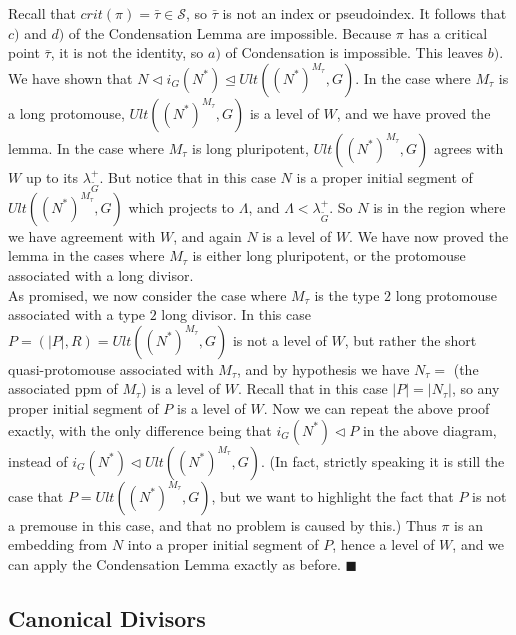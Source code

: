 \documentclass[12pt]{article}
\begin{document}
Recall that $crit (\pi) = \bar{\tau} \in \mathcal{S}$, so $\bar{\tau}$ is not an index or pseudoindex.  It follows that $c)$ and $d)$ of the Condensation Lemma are impossible.  Because $\pi$ has a critical point $\bar{\tau}$, it is not the identity, so $a)$ of Condensation is impossible.  This leaves $b)$.  We have shown that $N \lhd  i_G (N^*) \unlhd Ult ((N^*)^{M_\tau} , G )$.  In the case where $M_\tau$ is a long protomouse, $Ult ((N^*)^{M_\tau} , G )$ is a level of $W$, and we have proved the lemma.  In the case where $M_\tau$ is long pluripotent, $Ult ((N^*)^{M_\tau} , G )$ agrees with $W$ up to its $\lambda_{\tilde{G}}^+$.  But notice that in this case $N$ is a proper initial segment of $Ult ((N^*)^{M_\tau} , G )$ which projects to $\Lambda$, and $\Lambda < \lambda_{\tilde{G}}^+$.  So $N$ is in the region where we have agreement with $W$, and again $N$ is a level of $W$.  We have now proved the lemma in the cases where $M_\tau$ is either long pluripotent, or the protomouse associated with a long divisor.\\


As promised, we now consider the case where $M_\tau$ is the type $2$ long protomouse associated with a type $2$ long divisor.  In this case $P = (|P| , R ) = Ult ((N^*)^{M_\tau} , G )$ is not a level of $W$, but rather the short quasi-protomouse associated with $M_\tau$, and by hypothesis we have $N_\tau = $ (the associated ppm of $M_\tau$) is a level of $W$.  Recall that in this case $|P| = |N_\tau|$, so any proper initial segment of $P$ is a level of $W$.  Now we can repeat the above proof exactly, with the only difference being that $i_{G}(N^* ) \lhd P$ in the above diagram, instead of $i_{G}(N^* ) \lhd Ult ((N^*)^{M_\tau} , G )$.  (In fact, strictly speaking it is still the case that $P = Ult ((N^*)^{M_\tau} , G )$, but we want to highlight the fact that $P$ is not a premouse in this case, and that no problem is caused by this.)  Thus $\pi$ is an embedding from $N$ into a proper initial segment of $P$, hence a level of $W$, and we can apply the Condensation Lemma exactly as before. $\blacksquare$\\








\subsection{Canonical Divisors} \label{canonical divisor subsection}
\end{document}
